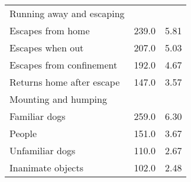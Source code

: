 \documentclass[varwidth=\maxdimen]{standalone}
\newcommand{\subrow}[1]{\hspace{1.25em}#1}
\begin{document}
\begin{tabular}[t]{lrr}
Running away and escaping \\
  \subrow{Escapes from home}                   &      239.0 &            5.81 \\
  \subrow{Escapes when out}                    &      207.0 &            5.03 \\
  \subrow{Escapes from confinement}            &      192.0 &            4.67 \\
  \subrow{Returns home after escape}           &      147.0 &            3.57 \\
Mounting and humping \\
  \subrow{Familiar dogs}                       &      259.0 &            6.30 \\
  \subrow{People}                              &      151.0 &            3.67 \\
  \subrow{Unfamiliar dogs}                     &      110.0 &            2.67 \\
  \subrow{Inanimate objects}                   &      102.0 &            2.48 \\
\bottomrule
\end{tabular}
\end{document}
